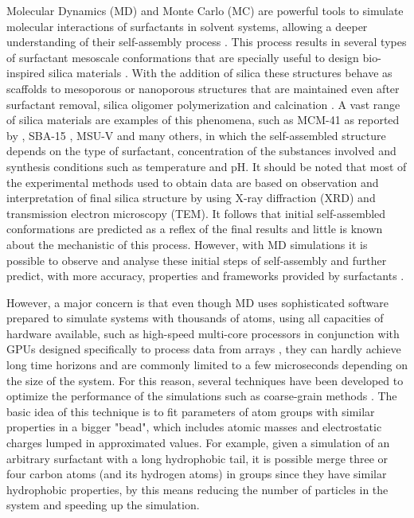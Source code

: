 \documentclass[10pt,a4paper,twoside]{article}
\begin{document}
Molecular Dynamics (MD) and Monte Carlo (MC) are powerful tools to simulate molecular interactions of surfactants in solvent systems, allowing a deeper understanding of their self-assembly process \cite{mjsilica}. This process results in several types of surfactant mesoscale conformations that are specially useful to design bio-inspired silica materials \cite{bioinsp}. With the addition of silica these structures behave as scaffolds to mesoporous or nanoporous structures that are maintained even after surfactant removal, silica oligomer polymerization and calcination \cite{silica1}.
A vast range of silica materials are examples of this phenomena, such as MCM-41 as reported by , SBA-15 \cite{sba}, MSU-V \cite{msuv} and many others, in which the self-assembled structure depends on the type of surfactant, concentration of the substances involved and synthesis conditions such as temperature and pH. It should be noted that most of the experimental methods used to obtain data are based on observation and interpretation of final silica structure by using X-ray diffraction (XRD) and transmission electron microscopy (TEM). It follows that initial self-assembled conformations are predicted as a reflex of the final results and little is known about the mechanistic of this process. However, with MD simulations it is possible to observe and analyse these initial steps of self-assembly and further predict, with more accuracy, properties and frameworks provided by surfactants \cite{lipid}.

However, a major concern is that even though MD uses sophisticated software prepared to simulate systems with thousands of atoms, using all capacities of hardware available, such as high-speed multi-core processors in conjunction with GPUs designed specifically to process data from arrays \cite{gromacs}, they can hardly achieve long time horizons and are commonly limited to a few microseconds depending on the size of the system. For this reason, several techniques have been developed to optimize the performance of the simulations such as coarse-grain methods \cite{mjsilica}. The basic idea of this technique is to fit parameters of atom groups with similar properties in a bigger "bead", which includes atomic masses and electrostatic charges lumped in approximated values. For example, given a simulation of an arbitrary surfactant with a long hydrophobic tail, it is possible merge three or four carbon atoms (and its hydrogen atoms) in groups since they have similar hydrophobic properties, by this means reducing the number of particles in the system and speeding up the simulation. 
\end{document}
